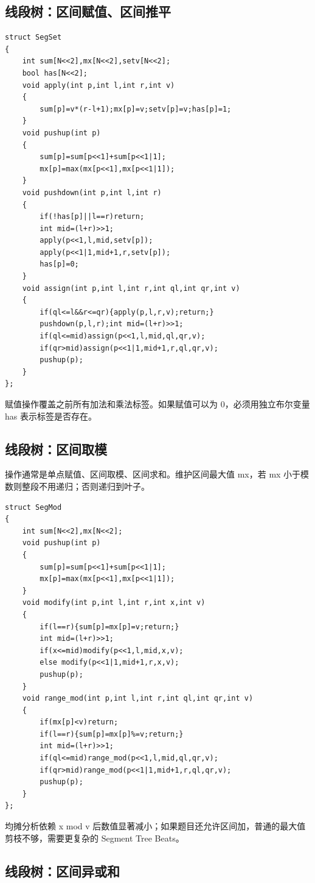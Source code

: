 \subsection{线段树：区间赋值、区间推平}

\begin{verbatim}
struct SegSet
{
    int sum[N<<2],mx[N<<2],setv[N<<2];
    bool has[N<<2];
    void apply(int p,int l,int r,int v)
    {
        sum[p]=v*(r-l+1);mx[p]=v;setv[p]=v;has[p]=1;
    }
    void pushup(int p)
    {
        sum[p]=sum[p<<1]+sum[p<<1|1];
        mx[p]=max(mx[p<<1],mx[p<<1|1]);
    }
    void pushdown(int p,int l,int r)
    {
        if(!has[p]||l==r)return;
        int mid=(l+r)>>1;
        apply(p<<1,l,mid,setv[p]);
        apply(p<<1|1,mid+1,r,setv[p]);
        has[p]=0;
    }
    void assign(int p,int l,int r,int ql,int qr,int v)
    {
        if(ql<=l&&r<=qr){apply(p,l,r,v);return;}
        pushdown(p,l,r);int mid=(l+r)>>1;
        if(ql<=mid)assign(p<<1,l,mid,ql,qr,v);
        if(qr>mid)assign(p<<1|1,mid+1,r,ql,qr,v);
        pushup(p);
    }
};
\end{verbatim}
赋值操作覆盖之前所有加法和乘法标签。如果赋值可以为 0，必须用独立布尔变量 has 表示标签是否存在。

\subsection{线段树：区间取模}

操作通常是单点赋值、区间取模、区间求和。维护区间最大值 mx，若 mx 小于模数则整段不用递归；否则递归到叶子。

\begin{verbatim}
struct SegMod
{
    int sum[N<<2],mx[N<<2];
    void pushup(int p)
    {
        sum[p]=sum[p<<1]+sum[p<<1|1];
        mx[p]=max(mx[p<<1],mx[p<<1|1]);
    }
    void modify(int p,int l,int r,int x,int v)
    {
        if(l==r){sum[p]=mx[p]=v;return;}
        int mid=(l+r)>>1;
        if(x<=mid)modify(p<<1,l,mid,x,v);
        else modify(p<<1|1,mid+1,r,x,v);
        pushup(p);
    }
    void range_mod(int p,int l,int r,int ql,int qr,int v)
    {
        if(mx[p]<v)return;
        if(l==r){sum[p]=mx[p]%=v;return;}
        int mid=(l+r)>>1;
        if(ql<=mid)range_mod(p<<1,l,mid,ql,qr,v);
        if(qr>mid)range_mod(p<<1|1,mid+1,r,ql,qr,v);
        pushup(p);
    }
};
\end{verbatim}
均摊分析依赖 x mod v 后数值显著减小；如果题目还允许区间加，普通的最大值剪枝不够，需要更复杂的 Segment Tree Beats。

\subsection{线段树：区间异或和}

